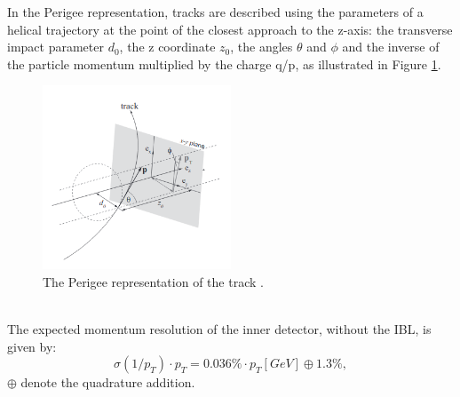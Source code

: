 In the Perigee representation, tracks are described using the parameters of a helical trajectory at the point of the closest approach to the z-axis: the transverse impact parameter $d_0$, the z coordinate $z_0$, the angles $\theta$ and $\phi$ and the inverse of the particle momentum multiplied by the charge q/p, as illustrated in Figure \ref{fig:chap2:ATLAS:ITK:Trk}.
\begin{figure}[htbp]
    \centering
    \includegraphics[width=0.5\textwidth]{Ch2/Img/Track.png}
    \caption{The Perigee representation of the track \cite{Track_schema}.}
    \label{fig:chap2:ATLAS:ITK:Trk}
\end{figure}
\\
The expected momentum resolution of the inner detector, without the IBL, is given by:
\begin{equation}
    \sigma(1/p_T)\cdot p_T = 0.036\%\cdot p_T [GeV] \oplus 1.3\%,
\end{equation}
$\oplus$ denote the quadrature addition.

